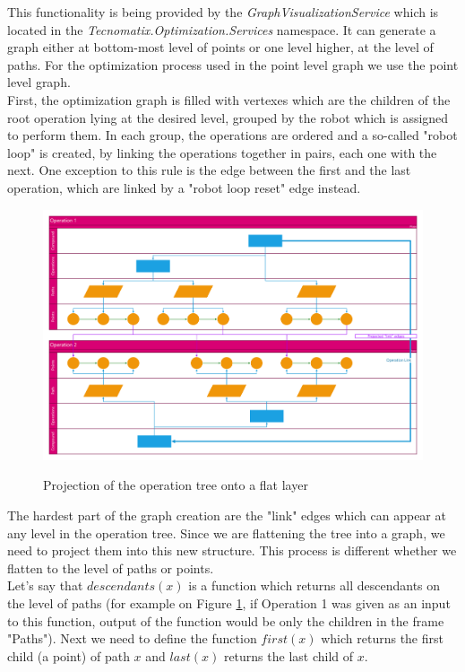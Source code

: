 This functionality is being provided by the \emph{GraphVisualizationService} which is located in the \emph{Tecnomatix.Optimization.Services} namespace. It can generate a graph either at bottom-most level of points or one level higher, at the level of paths. For the optimization process used in the point level graph we use the point level graph.\\

First, the optimization graph is filled with vertexes which are the children of the root operation lying at the desired level, grouped by the robot which is assigned to perform them. In each group, the operations are ordered and a so-called "robot loop" is created, by linking the operations together in pairs, each one with the next. One exception to this rule is the edge between the first and the last operation, which are linked by a "robot loop reset" edge instead. \\

\begin{figure}[ht]
	\caption{Projection of the operation tree onto a flat layer}
	\centering
	\includegraphics[width=1\textwidth]{graphprojection.pdf}
	\label{fig:GraphProjection}
\end{figure}

The hardest part of the graph creation are the "link" edges which can appear at any level in the operation tree. Since we are flattening the tree into a graph, we need to project them into this new structure. 
This process is different whether we flatten to the level of paths or points.  \\

Let’s say that $descendants(x)$ is a function which returns all descendants on the level of paths (for example on Figure \ref{fig:GraphProjection}, if Operation 1 was given as an input to this function, output of the function would be only the children in the frame "Paths"). Next we need to define the function $first(x)$ which returns the first child (a point) of path $x$ and $last(x)$ returns the last child of $x$.\\

